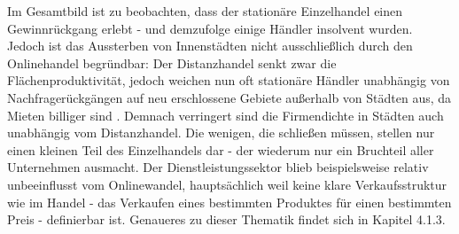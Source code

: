 Im Gesamtbild ist zu beobachten, dass der stationäre Einzelhandel einen Gewinnrückgang erlebt - und demzufolge einige Händler insolvent wurden. Jedoch ist das Aussterben von Innenstädten nicht ausschließlich durch den Onlinehandel begründbar: Der Distanzhandel senkt zwar die Flächenproduktivität, jedoch weichen nun oft stationäre Händler unabhängig von Nachfragerückgängen auf neu erschlossene Gebiete außerhalb von Städten aus, da Mieten billiger sind \cite[S. 30]{evilcom}. Demnach verringert sind die Firmendichte in Städten auch unabhängig vom Distanzhandel. Die wenigen, die schließen müssen, stellen nur einen kleinen Teil des Einzelhandels dar - der wiederum nur ein Bruchteil aller Unternehmen ausmacht. Der Dienstleistungssektor blieb beispielsweise relativ unbeeinflusst vom Onlinewandel, hauptsächlich weil keine klare Verkaufsstruktur wie im Handel - das Verkaufen eines bestimmten Produktes für einen bestimmten Preis - definierbar ist. Genaueres zu dieser Thematik findet sich in Kapitel 4.1.3.



